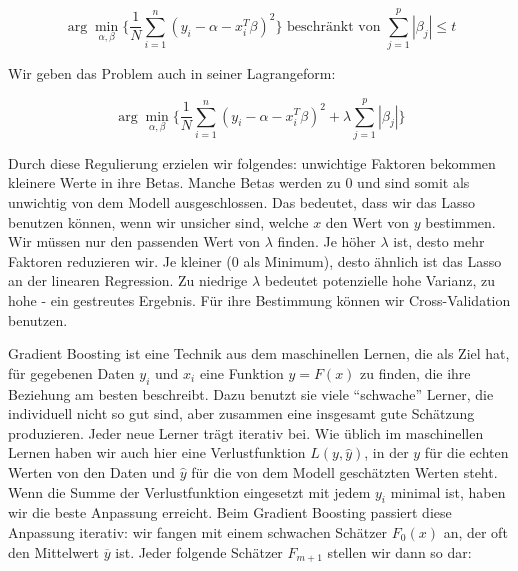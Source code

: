 \documentclass[12pt,a4paper,twoside]{scrartcl}
\numberwithin{equation}{section}
\newcounter{subsubsubsection}[subsubsection]
\begin{document}
\begin{equation}\label{eq:2.23}
	\arg\min_{\alpha, \beta} \bigg\{ \frac{1}{N}\sum_{i=1}^{n} (y_i - \alpha - x_i^T\beta)^2 \bigg\} \text{ beschränkt von } \sum_{j=1}^{p} |\beta_j| \leq t
\end{equation}  

\noindent
Wir geben das Problem auch in seiner Lagrangeform:\par 

\begin{equation}\label{eq:2.24}
	 \arg\min_{\alpha, \beta} \bigg\{ \frac{1}{N}\sum_{i=1}^{n} (y_i - \alpha - x_i^T\beta)^2 + \lambda  \sum_{j=1}^{p} |\beta_j| \bigg\}
\end{equation} 

\noindent
Durch diese Regulierung erzielen wir folgendes: unwichtige Faktoren bekommen kleinere Werte in ihre Betas. Manche Betas werden zu $0$ und sind somit als unwichtig von dem Modell ausgeschlossen. Das bedeutet, dass wir das Lasso benutzen können, wenn wir unsicher sind, welche $x$ den Wert von $y$ bestimmen\cite{tibshirani1996regression}. Wir müssen nur den passenden Wert von $\lambda$ finden. Je höher $\lambda$ ist, desto mehr Faktoren reduzieren wir. Je kleiner ($0$ als Minimum), desto ähnlich ist das Lasso an der linearen Regression.  Zu niedrige $\lambda$ bedeutet potenzielle hohe Varianz, zu hohe - ein gestreutes Ergebnis. Für ihre Bestimmung können wir Cross-Validation benutzen\cite{tibshirani1996regression}.\par 

\label{subsubsubsec:gradientBoosting}

Gradient Boosting ist eine Technik aus dem maschinellen Lernen, die als Ziel hat, für gegebenen Daten $y_i$ und $x_i$ eine Funktion $y=F(x)$ zu finden, die ihre Beziehung am besten beschreibt. Dazu benutzt sie viele \enquote{schwache} Lerner, die individuell nicht so gut sind, aber zusammen eine insgesamt gute Schätzung produzieren. Jeder neue Lerner trägt iterativ bei. Wie üblich im maschinellen Lernen haben wir auch hier eine Verlustfunktion $L(y,\hat y)$, in der $y$ für die echten Werten von den Daten und $\hat y$ für die von dem Modell geschätzten Werten steht. Wenn die Summe der Verlustfunktion eingesetzt mit jedem $y_i$ minimal ist, haben wir die beste Anpassung erreicht. Beim Gradient Boosting passiert diese Anpassung iterativ: wir fangen mit einem schwachen Schätzer $F_0(x)$ an, der oft den Mittelwert $\overline{y}$ ist\cite{gradientBoost}. Jeder folgende Schätzer $F_{m+1}$ stellen wir dann so dar:\par
\end{document}
